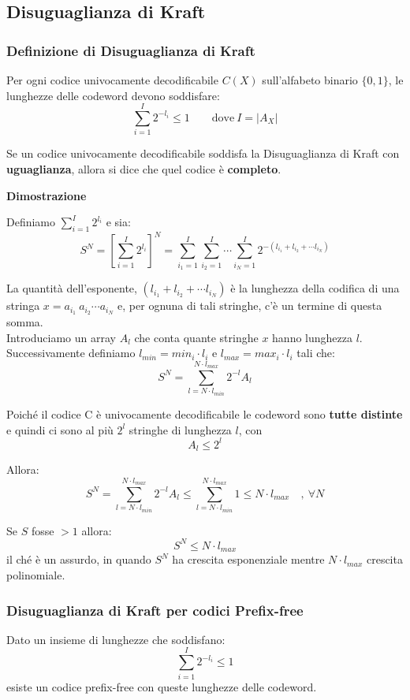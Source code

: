 \subsection{Disuguaglianza di Kraft}
\subsubsection{Definizione di Disuguaglianza di Kraft}
Per ogni codice univocamente decodificabile $C(X)$ sull'alfabeto binario $\{0,1\}$, le lunghezze delle codeword devono soddisfare:
\begin{equation}
	\sum_{i=1}^{I} 2^{-l_i} \leq 1 \qquad \text{dove}\ I = |A_X| 
\end{equation}

Se un codice univocamente decodificabile soddisfa la Disuguaglianza di Kraft con \textbf{uguaglianza}, allora si dice che quel codice è \textbf{completo}.

\textbf{Dimostrazione}

Definiamo $\sum_{i=1}^{I} 2^{l_i}$ e sia:
$$
S^N = \left[\sum_{i=1}^{I} 2^{l_i}\right]^N = \sum_{i_1 = 1}^{I} \sum_{i_2 = 1}^{I} \cdots \sum_{i_N = 1}^{I} 2^{-(l_{i_1} + l_{i_2} + \cdots l_{i_N})}
$$

La quantità dell'esponente, $(l_{i_1} + l_{i_2} + \cdots l_{i_N})$ è la lunghezza della codifica di una stringa $x = a_{i_1}\ a_{i_2}\cdots a_{i_N}$ e, per ognuna di tali stringhe, c'è un termine di questa somma.\\
Introduciamo un array $A_l$ che conta quante stringhe $x$ hanno lunghezza $l$.\\ Successivamente definiamo $l_{min} = min_i\cdot l_i$ e $l_{max} = max_i \cdot l_i$ tali che:
$$
S^N = \sum_{l=N\cdot l_{min}}^{N\cdot l_{max}} 2^{-l} A_l
$$

Poiché il codice C è univocamente decodificabile le codeword sono \textbf{tutte distinte} e quindi ci sono al più $2^l$ stringhe di lunghezza $l$, con $$A_l \leq 2^l$$

Allora:
$$
S^N = \sum_{l=N\cdot l_{min}}^{N\cdot l_{max}} 2^{-l} A_l \leq \sum_{l=N\cdot l_{min}}^{N\cdot l_{max}} 1 \leq N \cdot l_{max} \quad ,\ \forall N
$$

Se $S$ fosse $>1$ allora: $$S^N \leq N \cdot l_{max}$$
il ché è un assurdo, in quando $S^N$ ha crescita esponenziale mentre $N \cdot l_{max}$ crescita polinomiale.

\subsubsection{Disuguaglianza di Kraft per codici Prefix-free}
Dato un insieme di lunghezze che soddisfano:
$$
\sum_{i=1}^{I} 2^{-l_i} \leq 1
$$
esiste un codice prefix-free con queste lunghezze delle codeword.

